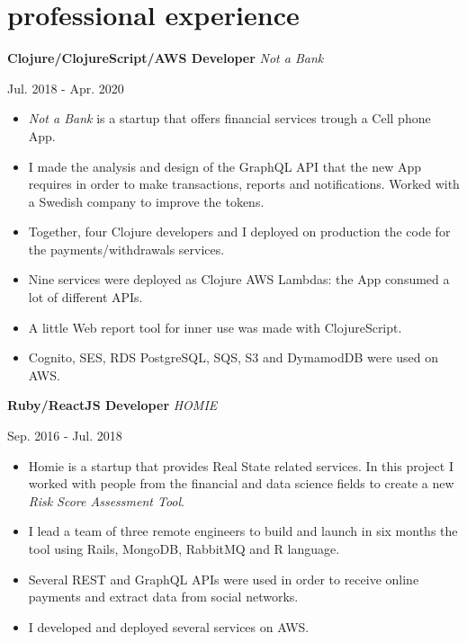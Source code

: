 \documentclass[]{k-cv}
\begin{document}
\section{professional experience}

  \textbf{Clojure/ClojureScript/AWS Developer}  \textit{Not a Bank}
  {\color{gray} {\small Jul. 2018 - Apr. 2020 \par}}
  \begin{itemize}
    \item \textit{Not a Bank} is a startup that offers financial services trough a Cell phone App.
    \item I made the analysis and design of the GraphQL API that the new App
          requires in order to make transactions, reports and notifications. Worked with a Swedish company to improve the tokens.
    \item Together, four Clojure developers and I deployed on production the code for the \linebreak
          payments/withdrawals services.
    \item Nine services were deployed as Clojure AWS Lambdas: the App consumed a lot of different APIs.
    \item A little Web report tool for inner use was made with ClojureScript.
    \item Cognito, SES, RDS PostgreSQL, SQS, S3 and DymamodDB were used on AWS.
  \end{itemize}

  \textbf{Ruby/ReactJS Developer}  \textit{HOMIE}
  {\color{gray} {\small Sep. 2016 - Jul. 2018 \par}}
  \begin{itemize}
    \item Homie is a startup that provides Real State related services. In this project I
          worked with people from the financial and data science fields to create a new
          \textit{Risk Score Assessment Tool}.
    \item I lead a team of three remote engineers to build and launch in six months the tool
          using Rails, MongoDB, RabbitMQ and R language.
    \item Several REST and GraphQL APIs were used in order to receive online payments and extract data from social networks.
    \item I developed and deployed several services on AWS.
  \end{itemize}
\end{document}
